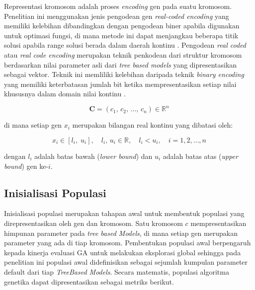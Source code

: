     Representasi kromosom adalah proses \textit{encoding} gen pada suatu kromosom. Penelitian ini menggunakan jenis pengodean gen \textit{real-coded encoding} yang memiliki kelebihan dibandingkan dengan pengodean biner apabila digunakan untuk optimasi fungsi, di mana metode ini dapat menjangkau beberapa titik solusi apabila range solusi berada dalam daerah kontinu \cite{mahmudy2013algoritma}. Pengodean \textit{real coded} atau \textit{real code encoding} merupakan teknik penkodean dari struktur kromosom berdasarkan nilai parameter asli dari \textit{tree based models} yang dipresentasikan sebagai vektor. Teknik ini memliliki kelebihan daripada teknik \textit{binary encoding} yang memiliki keterbatasan jumlah bit ketika mempresentasikan setiap nilai khususnya dalam domain nilai kontinu \cite{El-Hassani2024}.
 
    \begin{equation}
        \mathbf{C} = \left( c_1,\, c_2,\, \ldots,\, c_n \right) \in \mathbb{R}^n
    \end{equation}
     
    \noindent di mana setiap gen $x_i$ merupakan bilangan real kontinu yang dibatasi oleh:
     
    \begin{equation}
        x_i \in \left[ l_i,\; u_i \right], \quad l_i,\, u_i \in \mathbb{R},\quad l_i < u_i,
        \quad i = 1, 2, \ldots, n
    \end{equation}
     
    \noindent dengan $l_i$ adalah batas bawah (\textit{lower bound}) dan $u_i$ adalah
    batas atas (\textit{upper bound}) gen ke-$i$.
     
    \subsection{Inisialisasi Populasi}
    
    Inisialisasi populasi merupakan tahapan awal untuk membentuk populasi yang direpresentasikan oleh gen dan kromosom. Satu kromosom $c$ mempresentasikan himpunan parameter pada \textit{tree based Models}, di mana setiap gen merupakan parameter yang  ada di tiap kromosom. Pembentukan populasi awal berpengaruh kepada kinerja evaluasi GA untuk melakukan eksplorasi global sehingga pada penelitian ini populasi awal didefinisikan sebagai sejumlah kumpulan parameter default dari tiap \textit{TreeBased Models}. Secara matematis, populasi algoritma genetika dapat dipresentasikan sebagai metriks berikut.

